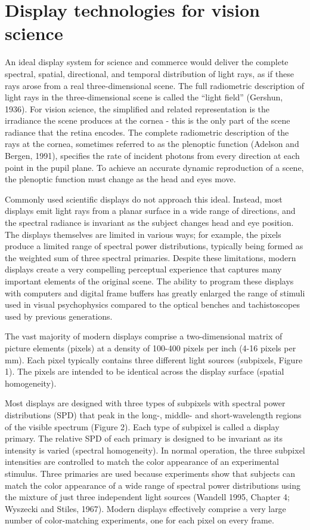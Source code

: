 \documentclass[
  letterpaper,
]{book}
\begin{document}
\section{Display technologies for vision
science}\label{display-technologies-for-vision-science}

An ideal display system for science and commerce would deliver the
complete spectral, spatial, directional, and temporal distribution of
light rays, as if these rays arose from a real three-dimensional scene.
The full radiometric description of light rays in the three-dimensional
scene is called the ``light field'' (Gershun, 1936). For vision science,
the simplified and related representation is the irradiance the scene
produces at the cornea - this is the only part of the scene radiance
that the retina encodes. The complete radiometric description of the
rays at the cornea, sometimes referred to as the plenoptic function
(Adelson and Bergen, 1991), specifies the rate of incident photons from
every direction at each point in the pupil plane. To achieve an accurate
dynamic reproduction of a scene, the plenoptic function must change as
the head and eyes move.

Commonly used scientific displays do not approach this ideal. Instead,
most displays emit light rays from a planar surface in a wide range of
directions, and the spectral radiance is invariant as the subject
changes head and eye position. The displays themselves are limited in
various ways; for example, the pixels produce a limited range of
spectral power distributions, typically being formed as the weighted sum
of three spectral primaries. Despite these limitations, modern displays
create a very compelling perceptual experience that captures many
important elements of the original scene. The ability to program these
displays with computers and digital frame buffers has greatly enlarged
the range of stimuli used in visual psychophysics compared to the
optical benches and tachistoscopes used by previous generations.

The vast majority of modern displays comprise a two-dimensional matrix
of picture elements (pixels) at a density of 100-400 pixels per inch
(4-16 pixels per mm). Each pixel typically contains three different
light sources (subpixels, Figure 1). The pixels are intended to be
identical across the display surface (spatial homogeneity).

Most displays are designed with three types of subpixels with spectral
power distributions (SPD) that peak in the long-, middle- and
short-wavelength regions of the visible spectrum (Figure 2). Each type
of subpixel is called a display primary. The relative SPD of each
primary is designed to be invariant as its intensity is varied (spectral
homogeneity). In normal operation, the three subpixel intensities are
controlled to match the color appearance of an experimental stimulus.
Three primaries are used because experiments show that subjects can
match the color appearance of a wide range of spectral power
distributions using the mixture of just three independent light sources
(Wandell 1995, Chapter 4; Wyszecki and Stiles, 1967). Modern displays
effectively comprise a very large number of color-matching experiments,
one for each pixel on every frame.
\end{document}
